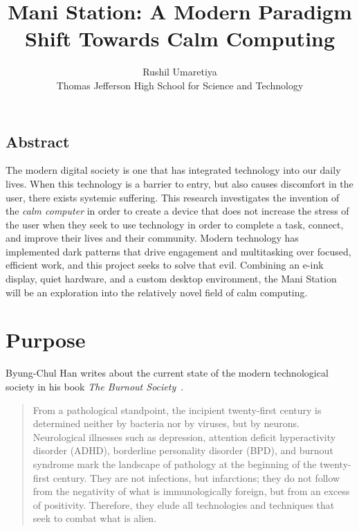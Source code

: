 \documentclass[letterpaper,twocolumn,10pt]{article}
\begin{document}

\date{}

\title{\Large \bf Mani Station: A Modern Paradigm Shift Towards Calm Computing}

\author{
{\rm Rushil Umaretiya}\\
Thomas Jefferson High School for Science and Technology
}

\maketitle

\subsection*{Abstract}
The modern digital society is one that has integrated technology into our daily lives. When this technology is a barrier to entry, but also causes discomfort in the user, there exists systemic suffering. This research investigates the invention of the \textit{calm computer} in order to create a device that does not increase the stress of the user when they seek to use technology in order to complete a task, connect, and improve their lives and their community. Modern technology has implemented dark patterns that drive engagement and multitasking over focused, efficient work, and this project seeks to solve that evil. Combining an e-ink display, quiet hardware, and a custom desktop environment, the Mani Station will be an exploration into the relatively novel field of calm computing.

\section{Purpose}

Byung-Chul Han writes about the current state of the modern technological society in his book \emph{The Burnout Society}~\cite{han_butler_2015}.
\begin{quote}
From a pathological standpoint, the incipient twenty-first century is determined neither by bacteria nor by viruses, but by neurons. Neurological illnesses such as depression, attention deficit hyperactivity disorder (ADHD), borderline personality disorder (BPD), and burnout syndrome mark the landscape of pathology at the beginning of the twenty-first century. They are not infections, but infarctions; they do not follow from the negativity of what is immunologically foreign, but from an excess of positivity. Therefore, they elude all technologies and techniques that seek to combat what is alien.
\end{quote}
\end{document}
